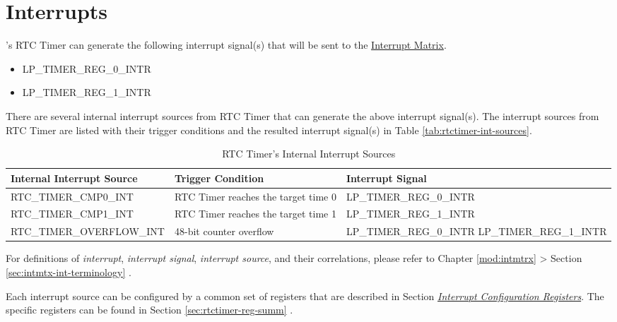 \documentclass[main\_\_EN.tex]{subfiles}
\begin{document}

\section{Interrupts}

\chipname{}'s RTC Timer can generate the following interrupt signal(s) that will be sent to the \hyperref[mod:intmtrx]{Interrupt Matrix}.

    \begin{itemize}
        \item LP\_TIMER\_REG\_0\_INTR
        \item LP\_TIMER\_REG\_1\_INTR
    \end{itemize}

There are several internal interrupt sources from RTC Timer that can generate the above interrupt signal(s). The interrupt sources from RTC Timer are listed with their trigger conditions and the resulted interrupt signal(s) in Table \ref{tab:rtctimer-int-sources}.


\begin{longtable}{ | L{5cm} | L{6.5cm} | L{4cm} | }
\caption{RTC Timer's Internal Interrupt Sources} \label{tab:rtctimer-int-sources}
\\ \hline
{}
\textbf{Internal Interrupt Source} & \textbf{Trigger Condition}  &  \textbf{Interrupt Signal}\\ \hline
\label{int:RTCTIMERCMP0INT}RTC\_TIMER\_CMP0\_INT &  RTC Timer reaches the target time 0 & LP\_TIMER\_REG\_0\_INTR  \\ \hline
\label{int:RTCTIMERCMP1INT}RTC\_TIMER\_CMP1\_INT &  RTC Timer reaches the target time 1 & LP\_TIMER\_REG\_1\_INTR \\ \hline
\label{int:RTCTIMEROVERFLOWINT}RTC\_TIMER\_OVERFLOW\_INT &  48-bit counter overflow & LP\_TIMER\_REG\_0\_INTR  LP\_TIMER\_REG\_1\_INTR\\ \hline
\end{longtable}

\begin{tiplisting}
For definitions of \textit{interrupt}, \textit{interrupt signal}, \textit{interrupt source}, and their correlations, please refer to Chapter \ref{mod:intmtrx} \textit{} > Section \ref{sec:intmtx-int-terminology} \textit{}.
\end{tiplisting}

Each interrupt source can be configured by a common set of registers that are described in Section \hyperref[interrupt-config-registers]{\textit{Interrupt Configuration Registers}}. The specific registers can be found in Section \ref{sec:rtctimer-reg-summ} \textit{}.
\end{document}

